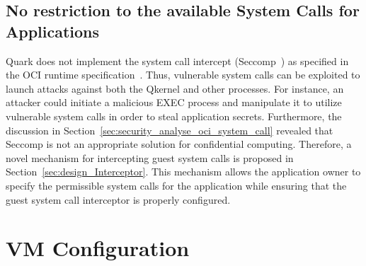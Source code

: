 
\subsection{No restriction to the available System Calls for Applications}

Quark does not implement the system call intercept (Seccomp~\cite*{seccomp}) as specified in the OCI runtime specification~\cite*{oci-runtime-spec}. Thus, vulnerable system calls can be exploited to launch attacks against both the Qkernel and other processes. For instance, an attacker could initiate a malicious EXEC process and manipulate it 
to utilize vulnerable system calls in order to steal application secrets. Furthermore, the discussion in Section~\ref{sec:security_analyse_oci_system_call} revealed that Seccomp is not an appropriate solution for confidential computing. Therefore, a novel mechanism for intercepting guest system calls is proposed in Section~\ref{sec:design_Interceptor}. This mechanism allows the 
application owner to specify the permissible system calls for the application while ensuring that the guest system call interceptor is properly configured. 




\section{VM Configuration}

